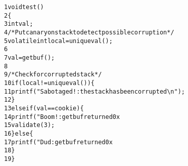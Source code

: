 \begin{alltt}
{\scriptsize   1} void test()
{\scriptsize   2} \verb:{:
{\scriptsize   3}     int val;
{\scriptsize   4}     /* Put canary on stack to detect possible corruption */
{\scriptsize   5}     volatile int local = uniqueval(); 
{\scriptsize   6} 
{\scriptsize   7}     val = getbuf(); 
{\scriptsize   8} 
{\scriptsize   9}     /* Check for corrupted stack */
{\scriptsize  10}     if (local != uniqueval()) \verb:{:
{\scriptsize  11}                 printf("Sabotaged!: the stack has been corrupted\verb:\n:");
{\scriptsize  12}     \verb:}:
{\scriptsize  13}     else if (val == cookie) \verb:{:
{\scriptsize  14}                 printf("Boom!: getbuf returned 0x%x\verb:\n:", val);
{\scriptsize  15}                 validate(3);
{\scriptsize  16}     \verb:}: else \verb:{:
{\scriptsize  17}         printf("Dud: getbuf returned 0x%x\verb:\n:", val);
{\scriptsize  18}     \verb:}:
{\scriptsize  19} \verb:}:
\end{alltt}
